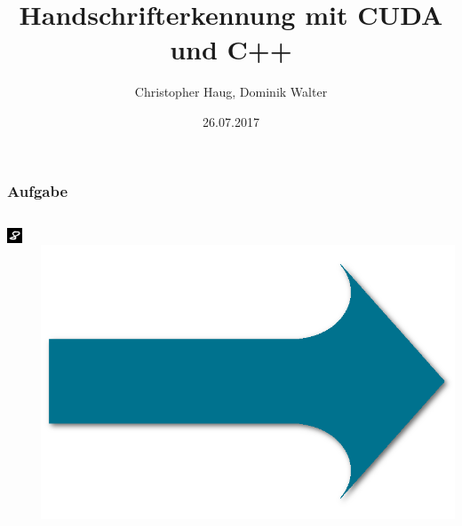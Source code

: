 \documentclass[xcolor=pdftex,dvipsnames,table]{beamer}
\title{Handschrifterkennung mit CUDA und C++}
\author{Christopher Haug, Dominik Walter}
\institute[Uni Augsburg]{University of Augsburg\\Systems and Networking}
\date[]{26.07.2017}
\begin{document}
	\frame{\titlepage}
	\begin{frame}
		\frametitle{Aufgabe}
		\begin{columns}
			\begin{column}{0.25\textwidth}
				\includegraphics[width=1\textwidth]{sample.png}
			\end{column}
			\begin{column}{0.05\textwidth}
				\\
				\includegraphics[width=1\textwidth]{arrow.png}\\

\end{column}
\end{columns}
\end{frame}
\end{document}
